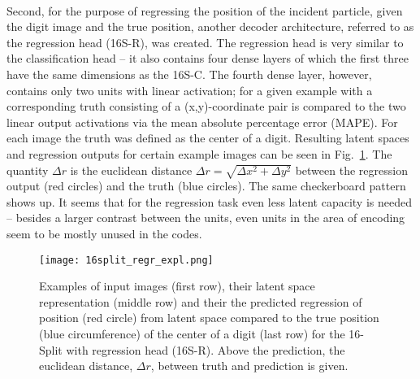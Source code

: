 \documentclass[../../main.tex]{subfiles}
\begin{document}
\\
Second, for the purpose of regressing the position of the incident particle, given the digit image and the true position, another decoder architecture, referred to as the regression head (16S-R), was created. The regression head is very similar to the classification head -- it also contains four dense layers of which the first three have the same dimensions as the 16S-C. The fourth dense layer, however, contains only two units with linear activation; for a given example with a corresponding truth consisting of a (x,y)-coordinate pair is compared to the two linear output activations via the mean absolute percentage error (MAPE). For each image the truth was defined as the center of a digit. Resulting latent spaces and regression outputs for certain example images can be seen in Fig.~\ref{fig:16reg}. The quantity $\Delta r$ is the euclidean distance $\Delta r= \sqrt{\Delta x^2+\Delta y^2}$ between the regression output (red circles) and the truth (blue circles). The same checkerboard pattern shows up. It seems that for the regression task even less latent capacity is needed -- besides a larger contrast between the units, even units in the area of encoding seem to be mostly unused in the codes.\\
\begin{figure}[htp]
			\begin{center}
				\texttt{[image: 16split\_regr\_expl.png]}
				\caption{Examples of input images (first row), their latent space representation (middle row) and their the predicted regression of position (red circle) from latent space compared to the true position (blue circumference) of the center of a digit (last row) for the 16-Split with regression head (16S-R). Above the prediction, the euclidean distance, $\Delta r$, between truth and prediction is given.}
				\label{fig:16reg}
			\end{center}
\end{figure}
\\
\end{document}
